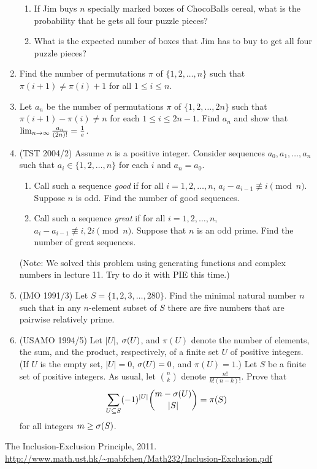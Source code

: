 \begin{enumerate}
\begin{enumerate}
\item
If Jim buys $n$ specially marked boxes of ChocoBalls cereal, what is the probability that he gets all four puzzle pieces?
\item
What is the expected number of boxes that Jim has to buy to get all four puzzle pieces?
\end{enumerate}
\item
Find the number of permutations $\pi$ of $\{1,2,\ldots, n\}$ such that $\pi(i+1)\ne \pi(i)+1$ for all $1\le i\le n$.
\item Let $a_n$ be the number of permutations $\pi$ of $\{1,2,\ldots, 2n\}$ such that $\pi(i+1)-\pi(i)\ne n$ for each $1\le i\le 2n-1$. Find $a_n$ and show that $\lim_{n\to \infty}\frac{a_n}{(2n)!}=\frac{1}{e}$.
\item (TST 2004/2) Assume $n$ is a positive integer. Consider sequences $a_0,a_1,\ldots, a_n$ such that $a_i\in \{1,2,\ldots, n\}$ for each $i$ and $a_n=a_0$.
\begin{enumerate}
\item
Call such a sequence {\it good} if for all $i=1,2,\ldots, n$, $a_i-a_{i-1}\nequiv i\pmod n$. Suppose $n$ is odd. Find the number of good sequences.
\item
Call such a sequence {\it great} if for all $i=1,2,\ldots, n$, $a_i-a_{i-1}\nequiv i,2i\pmod n$. Suppose that $n$ is an odd prime. Find the number of great sequences.
\end{enumerate}
(Note: We solved this problem using generating functions and complex numbers in lecture 11. Try to do it with PIE this time.)
\item (IMO 1991/3) Let $S=\{1,2,3,\ldots, 280\}$. Find the minimal natural number $n$ such that in any $n$-element subset of $S$ there are five numbers that are pairwise relatively prime.
\item (USAMO 1994/5)
Let $|U|$, $\sigma(U)$, and $\pi(U)$ denote the number of elements, the sum, and the product, respectively, of a finite set $U$ of positive integers. (If $U$ is the empty set, $|U|=0$, $\sigma(U)=0$, and $\pi(U)=1$.) Let $S$ be a finite set of positive integers. As usual, let $\binom nk$ denote $\frac{n!}{k!(n-k)!}$. Prove that
\[
\sum_{U\subseteq S} (-1)^{|U|} \binom{m-\sigma(U)}{|S|}=\pi(S)
\]
for all integers $m\ge \sigma(S)$.
\end{enumerate}
\begin{thebibliography}{9}
The Inclusion-Exclusion Principle, 2011. \url{http://www.math.ust.hk/~mabfchen/Math232/Inclusion-Exclusion.pdf}
\end{thebibliography}
